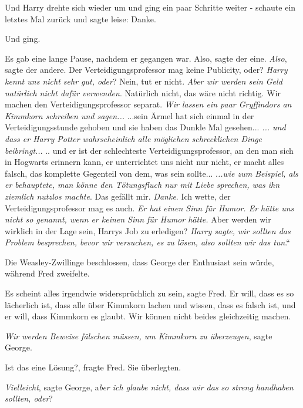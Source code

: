 Und Harry drehte sich wieder um und ging ein paar Schritte weiter - schaute ein
letztes Mal zurück und sagte leise: \glqq{}Danke.\grqq{}

Und ging.

Es gab eine lange Pause, nachdem er gegangen war. \glqq{}Also\grqq{}, sagte der
eine. \glqq{}\emph{Also}\grqq{}, sagte der andere. \glqq{}Der
Verteidigungsprofessor mag keine Publicity, oder?\grqq{} \glqq{}\emph{Harry kennt
uns nicht sehr gut, oder}?\grqq{} \glqq{}Nein, tut er nicht.\grqq{} \glqq
\emph{Aber wir werden sein Geld natürlich nicht dafür verwenden}.\grqq{} \glqq
Natürlich nicht, das wäre nicht richtig. Wir machen den Verteidigungsprofessor
separat.\grqq{} \glqq{}\emph{Wir lassen ein paar Gryffindors an Kimmkorn
schreiben und sagen...}\grqq{} \glqq{}...sein Ärmel hat sich einmal in der
Verteidigungsstunde gehoben und sie haben das Dunkle Mal gesehen...\grqq{} \glqq
\emph{... und dass er Harry Potter wahrscheinlich alle möglichen schrecklichen
Dinge} \emph{beibringt..}.\grqq{} \glqq{}.. und er ist der schlechteste
Verteidigungsprofessor, an den man sich in Hogwarts erinnern kann, er
unterrichtet uns nicht nur nicht, er macht alles falsch, das komplette Gegenteil
von dem, was sein sollte...\grqq{} \glqq{}.\emph{..wie zum Beispiel, als er
behauptete, man könne den Tötungsfluch nur mit Liebe sprechen, was ihn ziemlich
nutzlos machte}.\grqq{} \glqq{}Das gefällt mir.\grqq{} \glqq{}\emph{Danke}.\grqq{}
\glqq{}Ich wette, der Verteidigungsprofessor mag es auch.\grqq{} \glqq{}\emph{Er
hat einen Sinn für Humor. Er hätte uns nicht so genannt, wenn er keinen Sinn für
Humor hätte.}\grqq{} \glqq{}Aber werden wir wirklich in der Lage sein, Harrys Job
zu erledigen?\grqq{} \glqq{}\emph{Harry sagte, wir sollten das Problem
besprechen, bevor wir versuchen, es zu lösen, also sollten wir das tun}.“

Die Weasley-Zwillinge beschlossen, dass George der Enthusiast sein würde,
während Fred zweifelte.

\glqq{}Es scheint alles irgendwie widersprüchlich zu sein\grqq{}, sagte Fred.
\glqq{}Er will, dass es so lächerlich ist, dass alle über Kimmkorn lachen und
wissen, dass es falsch ist, und er will, dass Kimmkorn es glaubt. Wir können
nicht beides gleichzeitig machen.\grqq{}

\glqq{}\emph{Wir werden Beweise fälschen müssen, um Kimmkorn zu
überzeugen}\grqq{}, sagte George.

\glqq{}Ist das eine Lösung?\grqq{}, fragte Fred. Sie überlegten.

\glqq{}\emph{Vielleicht}\grqq{}, sagte George, \glqq{}a\emph{ber ich glaube nicht,
dass wir das so streng handhaben sollten, oder}?\grqq{}

